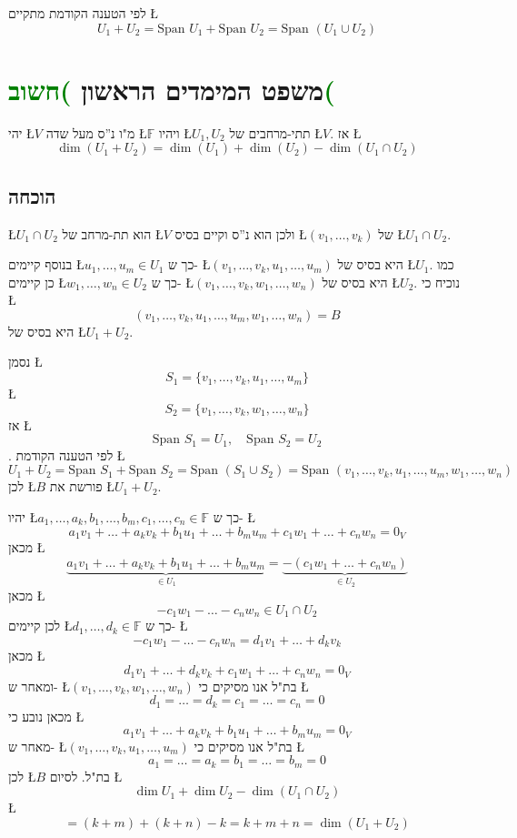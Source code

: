 \documentclass[english,hebrew]{article}
\newcommand{\spn}{\text{Span }}
\begin{document}
לפי הטענה הקודמת מתקיים \L{%
\[
U_{1}+U_{2}=\spn U_{1}+\spn U_{2}=\spn(U_{1}\cup U_{2})
\]
}%

\section{משפט המימדים הראשון \textcolor{green}{)חשוב(}}

יהי \L{$V$} מ"ו נ\textquotedblright ס מעל שדה \L{$\mathbb{F}$}
ויהיו \L{$U_{1},U_{2}$} תתי-מרחבים של \L{$V$}. אז \L{%
\[
\dim(U_{1}+U_{2})=\dim(U_{1})+\dim(U_{2})-\dim(U_{1}\cap U_{2})
\]
}%

\subsection{הוכחה}

\L{$U_{1}\cap U_{2}$} הוא תת-מרחב של \L{$V$} ולכן הוא נ\textquotedblright ס
וקיים בסיס \L{$(v_{1},\dots,v_{k})$} של \L{$U_{1}\cap U_{2}$}.

בנוסף קיימים \L{$u_{1},\dots,u_{m}\in U_{1}$} כך ש- \L{$(v_{1},\dots,v_{k},u_{1},\dots,u_{m})$}
היא בסיס של \L{$U_{1}$}. כמו כן קיימים \L{$w_{1},\dots,w_{n}\in U_{2}$}
כך ש- \L{$(v_{1},\dots,v_{k},w_{1},\dots,w_{n})$} היא בסיס של \L{$U_{2}$}.
נוכיח כי \L{%
\[
(v_{1},\dots,v_{k},u_{1},\dots,u_{m},w_{1},\dots,w_{n})=B
\]
}%
 היא בסיס של \L{$U_{1}+U_{2}$}.

נסמן \L{%
\[
S_{1}=\{v_{1},\dots,v_{k},u_{1},\dots,u_{m}\}
\]
}%
\L{%
\[
S_{2}=\{v_{1},\dots,v_{k},w_{1},\dots,w_{n}\}
\]
}%
אז \L{%
\[
\spn S_{1}=U_{1},\quad\spn S_{2}=U_{2}
\]
}%
. לפי הטענה הקודמת \L{%
\[
U_{1}+U_{2}=\spn S_{1}+\spn S_{2}=\spn(S_{1}\cup S_{2})=\spn(v_{1},\dots,v_{k},u_{1},\dots,u_{m},w_{1},\dots,w_{n})
\]
}%
לכן \L{$B$} פורשת את \L{$U_{1}+U_{2}$}.

יהיו \L{$a_{1},\dots,a_{k},b_{1},\dots,b_{m},c_{1},\dots,c_{n}\in\mathbb{F}$}
כך ש- \L{%
\[
a_{1}v_{1}+\dots+a_{k}v_{k}+b_{1}u_{1}+\dots+b_{m}u_{m}+c_{1}w_{1}+\dots+c_{n}w_{n}=0_{V}
\]
}%
מכאן \L{%
\[
\underbrace{a_{1}v_{1}+\dots+a_{k}v_{k}+b_{1}u_{1}+\dots+b_{m}u_{m}}_{\in U_{1}}=\underbrace{-(c_{1}w_{1}+\dots+c_{n}w_{n})}_{\in U_{2}}
\]
}%
מכאן \L{%
\[
-c_{1}w_{1}-\dots-c_{n}w_{n}\in U_{1}\cap U_{2}
\]
}%
לכן קיימים \L{$d_{1},\dots,d_{k}\in\mathbb{F}$} כך ש- \L{%
\[
-c_{1}w_{1}-\dots-c_{n}w_{n}=d_{1}v_{1}+\dots+d_{k}v_{k}
\]
}%
מכאן \L{%
\[
d_{1}v_{1}+\dots+d_{k}v_{k}+c_{1}w_{1}+\dots+c_{n}w_{n}=0_{V}
\]
}%
ומאחר ש- \L{$(v_{1},\dots,v_{k},w_{1},\dots,w_{n})$} בת"ל אנו מסיקים
כי \L{%
\[
d_{1}=\dots=d_{k}=c_{1}=\dots=c_{n}=0
\]
}%
 מכאן נובע כי \L{%
\[
a_{1}v_{1}+\dots+a_{k}v_{k}+b_{1}u_{1}+\dots+b_{m}u_{m}=0_{V}
\]
}%
מאחר ש- \L{$(v_{1},\dots,v_{k},u_{1},\dots,u_{m})$} בת"ל אנו מסיקים
כי \L{%
\[
a_{1}=\dots=a_{k}=b_{1}=\dots=b_{m}=0
\]
}%
 לכן \L{$B$} בת"ל. לסיום \L{%
\[
\dim U_{1}+\dim U_{2}-\dim(U_{1}\cap U_{2})
\]
}%
\L{%
\[
=(k+m)+(k+n)-k=k+m+n=\dim(U_{1}+U_{2})
\]
}%
\end{document}
